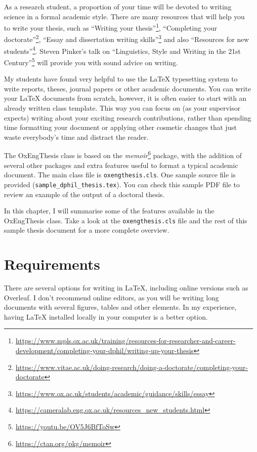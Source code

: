 As a research student, a proportion of your time will be devoted to writing science in a formal academic style. There are many resources that will help you to write your thesis, such as ``Writing your thesis''\footnote{\url{https://www.mpls.ox.ac.uk/training/resources-for-researcher-and-career-development/completing-your-dphil/writing-up-your-thesis}}, ``Completing your doctorate''\footnote{\url{https://www.vitae.ac.uk/doing-research/doing-a-doctorate/completing-your-doctorate}}, ``Essay and dissertation writing skills''\footnote{\url{https://www.ox.ac.uk/students/academic/guidance/skills/essay}} and also ``Resources for new students''\footnote{\url{https://cameralab.eng.ox.ac.uk/resources_new_students.html}}. Steven Pinker's talk on ``Linguistics, Style and Writing in the 21st Century''\footnote{\url{https://youtu.be/OV5J6BfToSw}} will provide you with sound advice on writing. 

My students have found very helpful to use the LaTeX typesetting system to write reports, theses, journal papers or other academic documents. You can write your LaTeX documents from scratch, however, it is often easier to start with an already written class template. This way you can focus on (as your supervisor expects) writing about your exciting research contributions, rather than spending time formatting your document or applying other cosmetic changes that just waste everybody's time and distract the reader. 

The OxEngThesis class is based on the \textit{memoir}\footnote{\url{https://ctan.org/pkg/memoir}} package, with the addition of several other packages and extra features useful to format a typical academic document. The main class file is \verb|oxengthesis.cls|. One sample source file is provided (\verb|sample_dphil_thesis.tex|). You can check this sample
PDF file to review an example of the output of a doctoral thesis.

In this chapter, I will summarise some of the features available in the OxEngThesis class. Take a look at the \verb|oxengthesis.cls| file and the rest of this sample thesis document for a more complete overview.


\section{Requirements}


There are several options for writing in LaTeX, including online versions such as Overleaf. I don't recommend online editors, as you will be writing long documents with several figures, tables and other elements. In my experience, having LaTeX installed locally in your computer is a better option.

